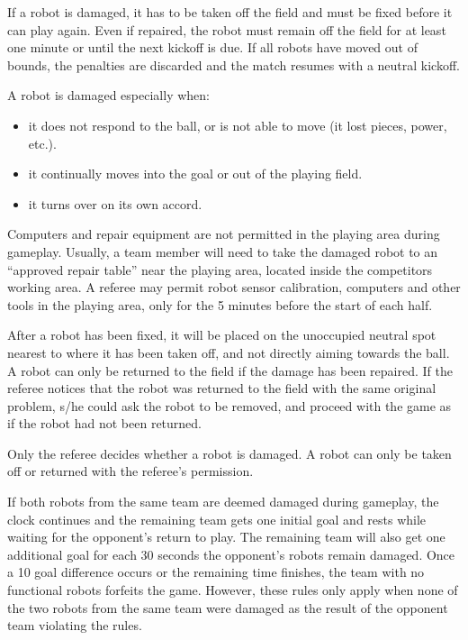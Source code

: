 \documentclass{article}
\begin{document}
If a robot is damaged, it has to be taken off the field and must be fixed before it can play again. Even if repaired, the robot must remain off the field for at least one minute or until the next kickoff is due. If all robots have moved out of bounds, the penalties are discarded and the match resumes with a neutral kickoff.

A robot is damaged especially when:

\begin{itemize}
\item it does not respond to the ball, or is not able to move (it lost pieces, power, etc.).

\item it continually moves into the goal or out of the playing field.

\item it turns over on its own accord.

\end{itemize}

Computers and repair equipment are not permitted in the playing area during gameplay. Usually, a team member will need to take the damaged robot to an ``approved repair table'' near the playing area, located inside the competitors working area. A referee may permit robot sensor calibration, computers and other tools in the playing area, only for the 5 minutes before the start of each half.

After a robot has been fixed, it will be placed on the unoccupied neutral spot nearest to where it has been taken off, and not directly aiming towards the ball. A robot can only be returned to the field if the damage has been repaired. If the referee notices that the robot was returned to the field with the same original problem, s/he could ask the robot to be removed, and proceed with the game as if the robot had not been returned.

Only the referee decides whether a robot is damaged. A robot can only be taken off or returned with the referee's permission.

If both robots from the same team are deemed damaged during gameplay, the clock continues and the remaining team gets one initial goal and rests while waiting for the opponent's return to play. The remaining team will also get one additional goal for each 30 seconds the opponent's robots remain damaged. Once a 10 goal difference occurs or the remaining time finishes, the team with no functional robots forfeits the game. However, these rules only apply when none of the two robots from the same team were damaged as the result of the opponent team violating the rules.
\end{document}
